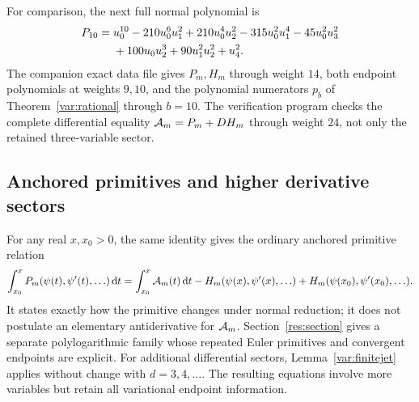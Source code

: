 For comparison, the next full normal polynomial is
\begin{align}\label{mom:P10}
 P_{10}={}&u_0^{10}-210u_0^6u_1^2+210u_0^4u_2^2
       -315u_0^2u_1^4-45u_0^2u_3^2\notag\\
       &+100u_0u_2^3+90u_1^2u_2^2+u_4^2.
\end{align}
The companion exact data file gives $P_m,H_m$ through weight $14$,
both endpoint polynomials at weights $9,10$, and the polynomial
numerators $p_b$ of Theorem~\ref{var:rational} through $b=10$.
The verification program checks the complete differential equality
$\mathcal A_m=P_m+DH_m$ through weight $24$, not only the retained
three-variable sector.

\subsection{Anchored primitives and higher derivative sectors}

For any real $x,x_0>0$, the same identity gives the ordinary anchored
primitive relation
\begin{equation}\label{mom:anchored}
 \int_{x_0}^x P_m(\psi(t),\psi'(t),\ldots)\,\mathrm d t
 =\int_{x_0}^x\mathcal A_m(t)\,\mathrm d t-H_m(\psi(x),\psi'(x),\ldots)
                           +H_m(\psi(x_0),\psi'(x_0),\ldots).
\end{equation}
It states exactly how the primitive changes under normal reduction;
it does not postulate an elementary antiderivative for $\mathcal A_m$.
Section~\ref{res:section} gives a separate polylogarithmic family
whose repeated Euler primitives and convergent endpoints are explicit.
For additional differential sectors, Lemma~\ref{var:finitejet} applies
without change with $d=3,4,\ldots$. The resulting equations involve
more variables but retain all variational endpoint information.
